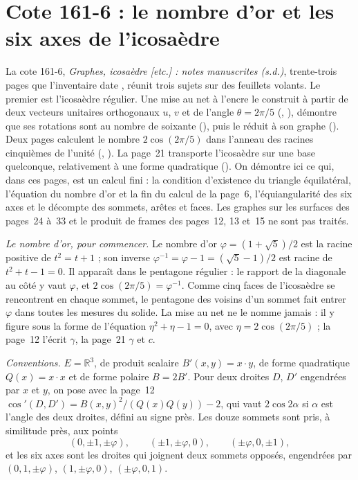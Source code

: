 \section[Cote 161-6 : le nombre d'or et les six axes de l'icosaèdre]{Cote 161-6 : le nombre d'or et les six axes de l'icosaèdre\protect{}}\label{sec:161-6}

La cote 161-6, \emph{Graphes, icosaèdre [etc.] : notes manuscrites (s.d.)}, trente-trois pages que l'inventaire date , réunit trois sujets sur des feuillets volants. Le premier est l'icosaèdre régulier. Une mise au net à l'encre le construit à partir de deux vecteurs unitaires orthogonaux $u$, $v$ et de l'angle $\theta = 2\pi/5$ (, ), démontre que ses rotations sont au nombre de soixante (), puis le réduit à son graphe (). Deux pages calculent le nombre $2\cos(2\pi/5)$ dans l'anneau des racines cinquièmes de l'unité (, ). La page~21 transporte l'icosaèdre sur une base quelconque, relativement à une forme quadratique (). On démontre ici ce qui, dans ces pages, est un calcul fini : la condition d'existence du triangle équilatéral, l'équation du nombre d'or et la fin du calcul de la page~6, l'équiangularité des six axes et le décompte des sommets, arêtes et faces. Les graphes sur les surfaces des pages~24 à~33 et le produit de frames des pages~12, 13 et~15 ne sont pas traités.

\noindent\emph{Le nombre d'or, pour commencer.} Le nombre d'or $\varphi = (1 + \sqrt5)/2$ est la racine positive de $t^2 = t + 1$ ; son inverse $\varphi^{-1} = \varphi - 1 = (\sqrt5 - 1)/2$ est racine de $t^2 + t - 1 = 0$. Il apparaît dans le pentagone régulier : le rapport de la diagonale au côté y vaut $\varphi$, et $2\cos(2\pi/5) = \varphi^{-1}$. Comme cinq faces de l'icosaèdre se rencontrent en chaque sommet, le pentagone des voisins d'un sommet fait entrer $\varphi$ dans toutes les mesures du solide. La mise au net ne le nomme jamais : il y figure sous la forme de l'équation $\eta^2 + \eta - 1 = 0$, avec $\eta = 2\cos(2\pi/5)$ ; la page~12 l'écrit $\gamma$, la page~21 $\gamma$ et $c$.

\noindent\emph{Conventions.} $E = \mathbb R^3$, de produit scalaire $B'(x, y) = x \cdot y$, de forme quadratique $Q(x) = x \cdot x$ et de forme polaire $B = 2B'$. Pour deux droites $D$, $D'$ engendrées par $x$ et $y$, on pose avec la page~12 $\cos'(D, D') = B(x, y)^2/(Q(x)Q(y)) - 2$, qui vaut $2\cos 2\alpha$ si $\alpha$ est l'angle des deux droites, défini au signe près. Les douze sommets sont pris, à similitude près, aux points
\[
(0, \pm 1, \pm\varphi), \qquad (\pm 1, \pm\varphi, 0), \qquad (\pm\varphi, 0, \pm 1),
\]
et les six axes sont les droites qui joignent deux sommets opposés, engendrées par $(0, 1, \pm\varphi)$, $(1, \pm\varphi, 0)$, $(\pm\varphi, 0, 1)$.

